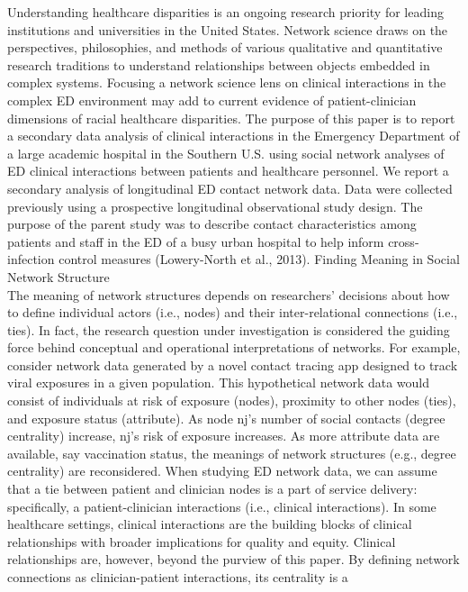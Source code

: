 \documentclass[]{elsarticle} %
\begin{document}
Understanding healthcare disparities is an ongoing research priority for
leading institutions and universities in the United States. Network
science draws on the perspectives, philosophies, and methods of various
qualitative and quantitative research traditions to understand
relationships between objects embedded in complex systems. Focusing a
network science lens on clinical interactions in the complex ED
environment may add to current evidence of patient-clinician dimensions
of racial healthcare disparities. The purpose of this paper is to report
a secondary data analysis of clinical interactions in the Emergency
Department of a large academic hospital in the Southern U.S. using
social network analyses of ED clinical interactions between patients and
healthcare personnel. We report a secondary analysis of longitudinal ED
contact network data. Data were collected previously using a prospective
longitudinal observational study design. The purpose of the parent study
was to describe contact characteristics among patients and staff in the
ED of a busy urban hospital to help inform cross-infection control
measures (Lowery-North et al., 2013). Finding Meaning in Social Network
Structure\\
The meaning of network structures depends on researchers' decisions
about how to define individual actors (i.e., nodes) and their
inter-relational connections (i.e., ties). In fact, the research
question under investigation is considered the guiding force behind
conceptual and operational interpretations of networks. For example,
consider network data generated by a novel contact tracing app designed
to track viral exposures in a given population. This hypothetical
network data would consist of individuals at risk of exposure (nodes),
proximity to other nodes (ties), and exposure status (attribute). As
node nj's number of social contacts (degree centrality) increase, nj's
risk of exposure increases. As more attribute data are available, say
vaccination status, the meanings of network structures (e.g., degree
centrality) are reconsidered. When studying ED network data, we can
assume that a tie between patient and clinician nodes is a part of
service delivery: specifically, a patient-clinician interactions (i.e.,
clinical interactions). In some healthcare settings, clinical
interactions are the building blocks of clinical relationships with
broader implications for quality and equity. Clinical relationships are,
however, beyond the purview of this paper. By defining network
connections as clinician-patient interactions, its centrality is a
\end{document}
